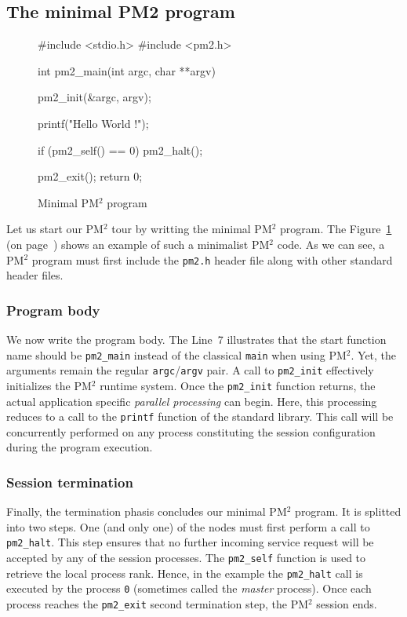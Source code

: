 \documentclass[a4paper,11pt]{report}
\def\pm2{PM$^2$\xspace}
\begin{document}
\subsection{The minimal PM2 program}
\begin{figure}[p]
\begin{center}
\begin{boxedminipage}{0.8\textwidth}
\begin{footnotesize}
\begin{listing}{0}
 #include <stdio.h>
 #include <pm2.h>

 int pm2_main(int argc, char **argv)
 {
   pm2_init(&argc, argv);

   printf("Hello World !\n");
  
   if (pm2_self() == 0)
     pm2_halt();
  
   pm2_exit();
   return 0;
 }
\end{listing}
\end{footnotesize}
\end{boxedminipage}
\end{center}
\caption{Minimal \pm2 program\label{fig:ex1}}
\end{figure}
\afterpage{\clearpage}
Let us start our \pm2 tour by writting the minimal \pm2 program. The
Figure~\ref{fig:ex1} (on page~\pageref{fig:ex1}) shows an example of
such a minimalist \pm2 code. As we can see, a \pm2 program must first
include the \texttt{pm2.h} header file along with other standard
header files.

\subsubsection{Program body}
We now write the program body. The Line~7 illustrates that the start
function name should be \texttt{pm2\_main} instead of the classical
\texttt{main} when using \pm2. Yet, the arguments remain the regular
\texttt{argc}/\texttt{argv} pair. A call to \texttt{pm2\_init}
effectively initializes the \pm2 runtime system. Once the
\texttt{pm2\_init} function returns, the actual application specific
\emph{parallel processing} can begin. Here, this processing reduces to
a call to the \texttt{printf} function of the standard library. This
call will be concurrently performed on any process constituting the
session configuration during the program execution.

\subsubsection{Session termination}
Finally, the termination phasis concludes our minimal \pm2 program. It
is splitted into two steps. One (and only one) of the nodes must first
perform a call to \texttt{pm2\_halt}. This step ensures that no
further incoming service request will be accepted by any of the
session processes. The \texttt{pm2\_self} function is used to retrieve
the local process rank. Hence, in the example the \texttt{pm2\_halt}
call is executed by the process \texttt{0} (sometimes called the
\emph{master} process). Once each process reaches the
\texttt{pm2\_exit} second termination step, the \pm2 session ends.
\end{document}
